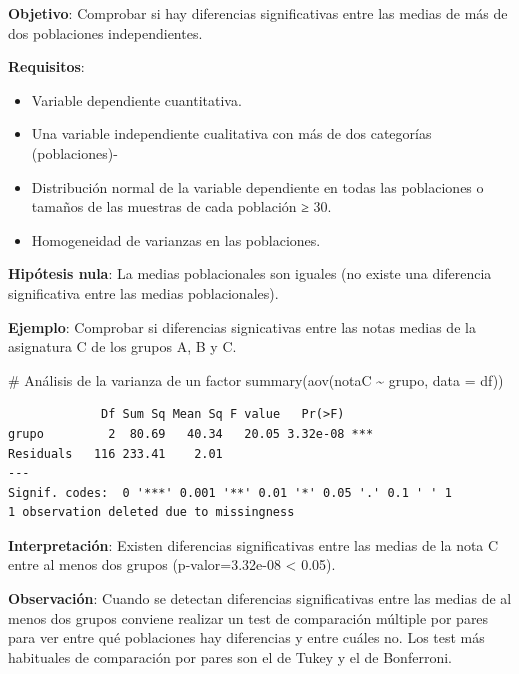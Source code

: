 \documentclass[
  a4paper,
]{scrreport}
\newenvironment{Shaded}{\begin{snugshade}}{\end{snugshade}}
\newcommand{\AttributeTok}[1]{\textcolor[rgb]{0.40,0.45,0.13}{#1}}
\newcommand{\CommentTok}[1]{\textcolor[rgb]{0.37,0.37,0.37}{#1}}
\newcommand{\FunctionTok}[1]{\textcolor[rgb]{0.28,0.35,0.67}{#1}}
\newcommand{\NormalTok}[1]{\textcolor[rgb]{0.00,0.23,0.31}{#1}}
\newcommand{\SpecialCharTok}[1]{\textcolor[rgb]{0.37,0.37,0.37}{#1}}
\providecommand{\tightlist}{%
  \setlength{\itemsep}{0pt}\setlength{\parskip}{0pt}}\usepackage{longtable,booktabs,array}
\theoremstyle{definition}
\theoremstyle{definition}
\theoremstyle{remark}
\begin{document}
\textbf{Objetivo}: Comprobar si hay diferencias significativas entre las
medias de más de dos poblaciones independientes.

\textbf{Requisitos}:

\begin{itemize}
\tightlist
\item
  Variable dependiente cuantitativa.
\item
  Una variable independiente cualitativa con más de dos categorías
  (poblaciones)-
\item
  Distribución normal de la variable dependiente en todas las
  poblaciones o tamaños de las muestras de cada población ≥ 30.
\item
  Homogeneidad de varianzas en las poblaciones.
\end{itemize}

\textbf{Hipótesis nula}: La medias poblacionales son iguales (no existe
una diferencia significativa entre las medias poblacionales).

\textbf{Ejemplo}: Comprobar si diferencias signicativas entre las notas
medias de la asignatura C de los grupos A, B y C.

\begin{Shaded}
\begin{Highlighting}[]
\CommentTok{\# Análisis de la varianza de un factor}
\FunctionTok{summary}\NormalTok{(}\FunctionTok{aov}\NormalTok{(notaC }\SpecialCharTok{\textasciitilde{}}\NormalTok{ grupo, }\AttributeTok{data =}\NormalTok{ df))}
\end{Highlighting}
\end{Shaded}

\begin{verbatim}
             Df Sum Sq Mean Sq F value   Pr(>F)    
grupo         2  80.69   40.34   20.05 3.32e-08 ***
Residuals   116 233.41    2.01                     
---
Signif. codes:  0 '***' 0.001 '**' 0.01 '*' 0.05 '.' 0.1 ' ' 1
1 observation deleted due to missingness
\end{verbatim}

\textbf{Interpretación}: Existen diferencias significativas entre las
medias de la nota C entre al menos dos grupos (p-valor=3.32e-08
\textless{} 0.05).

\textbf{Observación}: Cuando se detectan diferencias significativas
entre las medias de al menos dos grupos conviene realizar un test de
comparación múltiple por pares para ver entre qué poblaciones hay
diferencias y entre cuáles no. Los test más habituales de comparación
por pares son el de Tukey y el de Bonferroni.
\end{document}
